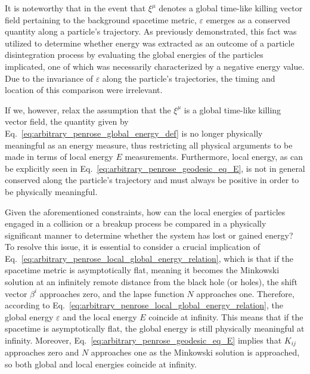 It is noteworthy that in the event that $\xi^\mu$ denotes a global time-like killing vector field pertaining to the background spacetime metric, $\varepsilon$ emerges as a conserved quantity along a particle's trajectory. As previously demonstrated, this fact was utilized to determine whether energy was extracted as an outcome of a particle disintegration process by evaluating the global energies of the particles implicated, one of which was necessarily characterized by a negative energy value. Due to the invariance of $\varepsilon$ along the particle's trajectories, the timing and location of this comparison were irrelevant.

If we, however, relax the assumption that the $\xi^\mu$ is a global time-like killing vector field, the quantity given by Eq.~\eqref{eq:arbitrary_penrose_global_energy_def} is no longer physically meaningful as an energy measure, thus restricting all physical arguments to be made in terms of local energy $E$ measurements. Furthermore, local energy, as can be explicitly seen in Eq.~\eqref{eq:arbitrary_penrose_geodesic_eq_E}, is not in general conserved along the particle's trajectory and must always be positive in order to be physically meaningful.

Given the aforementioned constraints, how can the local energies of particles engaged in a collision or a breakup process be compared in a physically significant manner to determine whether the system has lost or gained energy? To resolve this issue, it is essential to consider a crucial implication of Eq.~\eqref{eq:arbitrary_penrose_local_global_energy_relation}, which is that if the spacetime metric is asymptotically flat, meaning it becomes the Minkowski solution at an infinitely remote distance from the black hole (or holes), the shift vector $\beta^i$ approaches zero, and the lapse function $N$ approaches one. Therefore, according to Eq.~\eqref{eq:arbitrary_penrose_local_global_energy_relation}, the global energy $\varepsilon$ and the local energy $E$ coincide at infinity. This means that if the spacetime is asymptotically flat, the global energy is still physically meaningful at infinity. Moreover, Eq.~\eqref{eq:arbitrary_penrose_geodesic_eq_E} implies that $K_{ij}$ approaches zero and $N$ approaches one as the Minkowski solution is approached, so both global and local energies coincide at infinity.

